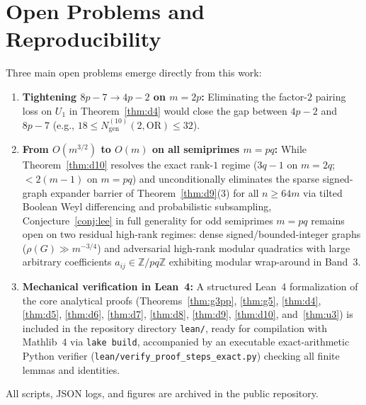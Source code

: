 \documentclass[11pt,a4paper]{article}
\theoremstyle{definition}
\newcommand{\Z}{\mathbb{Z}}
\newcommand{\OR}{\mathrm{OR}}
\newcommand{\Ngen}{N_{\mathrm{gen}}}
\begin{document}
\section{Open Problems and Reproducibility}
\label{sec:open}

Three main open problems emerge directly from this work:
\begin{enumerate}[leftmargin=*]
  \item \textbf{Tightening $8p - 7 \to 4p - 2$ on $m = 2p$:} Eliminating the factor-$2$ pairing loss on $U_1$ in Theorem~\ref{thm:d4} would close the gap between $4p - 2$ and $8p - 7$ (e.g., $18 \le \Ngen^{(10)}(2, \OR) \le 32$).
  \item \textbf{From $O(m^{3/2})$ to $O(m)$ on all semiprimes $m = pq$:} While Theorem~\ref{thm:d10} resolves the exact rank-$1$ regime ($3q-1$ on $m = 2q$; $< 2(m-1)$ on $m = pq$) and unconditionally eliminates the sparse signed-graph expander barrier of Theorem~\ref{thm:d9}(3) for all $n \ge 64m$ via tilted Boolean Weyl differencing and probabilistic subsampling, Conjecture~\ref{conj:lee} in full generality for odd semiprimes $m = pq$ remains open on two residual high-rank regimes: dense signed/bounded-integer graphs ($\rho(G) \gg m^{-3/4}$) and adversarial high-rank modular quadratics with large arbitrary coefficients $a_{ij} \in \Z/pq\Z$ exhibiting modular wrap-around in Band~3.
  \item \textbf{Mechanical verification in Lean~4:} A structured Lean~4 formalization of the core analytical proofs (Theorems~\ref{thm:g3pp}, \ref{thm:g5}, \ref{thm:d4}, \ref{thm:d5}, \ref{thm:d6}, \ref{thm:d7}, \ref{thm:d8}, \ref{thm:d9}, \ref{thm:d10}, and~\ref{thm:u3}) is included in the repository directory \texttt{lean/}, ready for compilation with Mathlib~4 via \texttt{lake build}, accompanied by an executable exact-arithmetic Python verifier (\texttt{lean/verify\_proof\_steps\_exact.py}) checking all finite lemmas and identities.
\end{enumerate}

All scripts, JSON logs, and figures are archived in the public repository.



\end{document}
